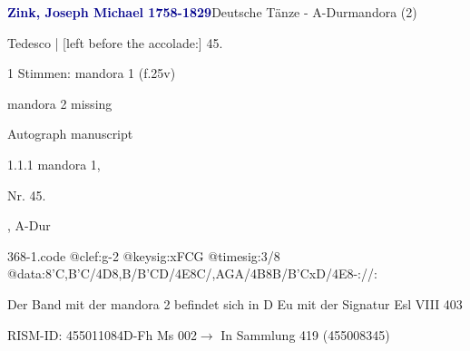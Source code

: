 \documentclass[twocolumn]{book}
\begin{document}
\par \vspace{7pt} \textcolor{darkblue}{\textbf{Zink, Joseph Michael  1758-1829}}\hfillplus{\textbf{[368]}}\newline Deutsche Tänze - A-Dur\newline mandora (2)
\par \begin{itshape}[f.25v, at left:] Tedesco | [left before the accolade:] 45.\end{itshape} 
\par \textcolor{darkblue}{}  1 Stimmen: mandora 1  (f.25v)\newline \begin{small} mandora 2 missing\end{small} \newline Autograph manuscript
\par 1.1.1  mandora 1, \begin{itshape}Nr. 45.\end{itshape}, A-Dur  
\begin{filecontents*}{368-1.code}
@clef:g-2
@keysig:xFCG
@timesig:3/8
@data:8'C,B'C/4D8,B/B'CD/4E8C/,A{GA}/4B8B/B'CxD/4E8-://:
\end{filecontents*}
\newline
%
\par Der Band mit der mandora 2 befindet sich in D Eu mit der Signatur Esl VIII 403
\par RISM-ID: 455011084\newline D-Fh  Ms 002\newline $\rightarrow$ In Sammlung 419 (455008345)
      
\end{document}
